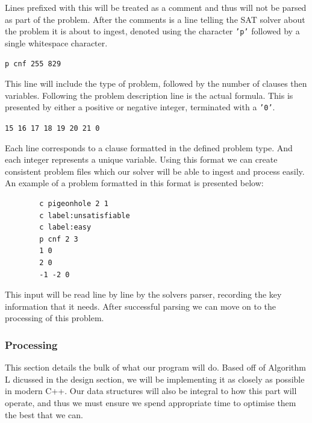 \documentclass{article}
\begin{document}
Lines prefixed with this will be treated as a
comment and thus will not be parsed as part of the problem. After the comments is a line telling the
SAT solver about the problem it is about to ingest, denoted using the character \texttt{'p'}
followed by a single whitespace character.

\begin{center}
    \texttt{p cnf 255 829}
\end{center}

This line will include the type of problem, followed by the number of clauses then
variables. Following the problem description line is the actual formula. This is presented by either
a positive or negative integer, terminated with a \texttt{'0'}.

\begin{center}
    \texttt{15 16 17 18 19 20 21 0}
\end{center}

Each line corresponds to a clause formatted in the defined problem type. And each integer represents
a unique variable. Using this format we can create consistent problem files which our solver will be
able to ingest and process easily. An example of a problem formatted in this format is presented
below:

\begin{center}
    \begin{lstlisting}
        c pigeonhole 2 1
        c label:unsatisfiable
        c label:easy
        p cnf 2 3
        1 0
        2 0
        -1 -2 0
    \end{lstlisting}
\end{center}

This input will be read line by line by the solvers parser, recording the key information that it
needs. After successful parsing we can move on to the processing of this problem.

\subsubsection{Processing}
This section details the bulk of what our program will do. Based off of Algorithm L dicussed in the design section, we will be
implementing it as closely as possible in modern C++. Our data structures will also be integral to how this part will operate, and
thus we must ensure we spend appropriate time to optimise them the best that we can.
\end{document}
